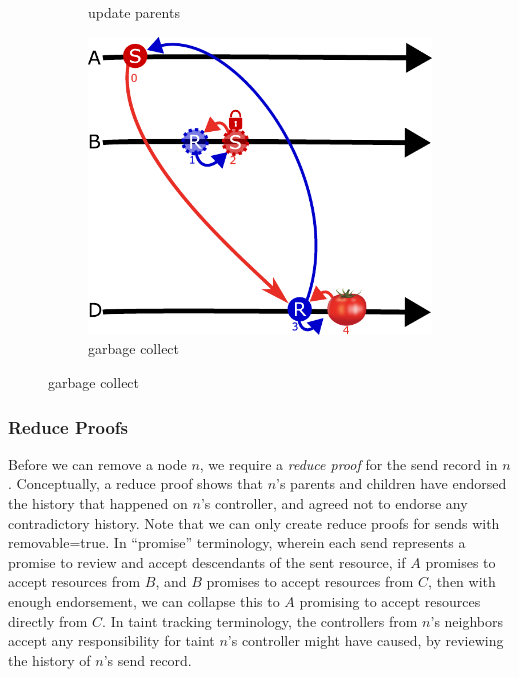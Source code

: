 \documentclass[a4paper,USenglish,cleveref, autoref, thm-restate, anonymous]{lipics-v2021}
\begin{document}
\begin{figure}[t]
\begin{subfigure}{.19\textwidth}
  \caption{update parents}
  \label{fig:update}
\end{subfigure}
\begin{subfigure}{.19\textwidth}
  \centering
  \includegraphics[width=\linewidth]{figs/sends_and_receives_remove_receive.pdf}  
  \caption{garbage collect}
  \label{fig:garbage}
\end{subfigure}
\label{fig:reduce-proof}
\end{figure}

\subsubsection{Reduce Proofs}
Before we can remove a node $n$, we require a \emph{reduce proof} for the send record in $n$.
Conceptually, a reduce proof shows that $n$'s parents and children have endorsed the history that happened on $n$'s controller, and agreed not to endorse any contradictory history.
Note that we can only create reduce proofs for sends with removable=true.
In ``promise'' terminology, wherein each send represents a promise to review and accept descendants of the sent resource, if $A$ promises to accept resources from $B$, and $B$ promises to accept resources from $C$, then with enough endorsement, we can collapse this to $A$ promising to accept resources directly from $C$. 
In taint tracking terminology, the controllers from $n$'s neighbors accept any responsibility for taint $n$'s controller might have caused, by reviewing the history of $n$'s send record. 
\end{document}
